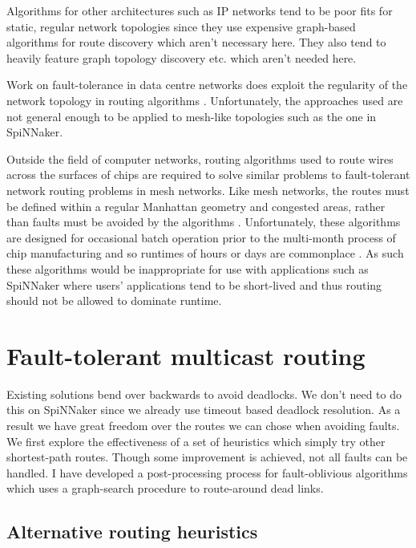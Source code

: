 		Algorithms for other architectures such as IP networks tend to be poor fits
		for static, regular network topologies since they use expensive graph-based
		algorithms for route discovery which aren't necessary here. They also tend
		to heavily feature graph topology discovery etc. which aren't needed here.
		
		Work on fault-tolerance in data centre networks does exploit the regularity
		of the network topology in routing algorithms \cite{guo08,liao12}.
		Unfortunately, the approaches used are not general enough to be applied to
		mesh-like topologies such as the one in SpiNNaker.
		
		Outside the field of computer networks, routing algorithms used to route
		wires across the surfaces of chips are required to solve similar problems
		to fault-tolerant network routing problems in mesh networks. Like mesh
		networks, the routes must be defined within a regular Manhattan geometry
		and congested areas, rather than faults must be avoided by the algorithms
		\cite{kahng11}.  Unfortunately, these algorithms are designed for
		occasional batch operation prior to the multi-month process of chip
		manufacturing and so runtimes of hours or days are commonplace
		\cite{nam08}. As such these algorithms would be inappropriate for use with
		applications such as SpiNNaker where users' applications tend to be
		short-lived and thus routing should not be allowed to dominate runtime.
	
	\section{Fault-tolerant multicast routing}
		
		Existing solutions bend over backwards to avoid deadlocks. We don't need to
		do this on SpiNNaker since we already use timeout based deadlock
		resolution. As a result we have great freedom over the routes we can chose
		when avoiding faults. We first explore the effectiveness of a set of
		heuristics which simply try other shortest-path routes. Though some
		improvement is achieved, not all faults can be handled. I have developed a
		post-processing process for fault-oblivious algorithms which uses a
		graph-search procedure to route-around dead links.
		
		\subsection{Alternative routing heuristics}
			
